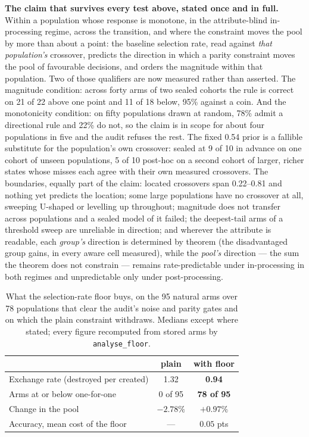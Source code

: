 \documentclass[conference]{IEEEtran}
\begin{document}
\textbf{The claim that survives every test above, stated once and in full.} Within a
population whose response is monotone, in the attribute-blind in-processing regime, across
the transition, and where the constraint moves the pool by more than about a point: the
baseline selection rate, read against \emph{that population's} crossover, predicts the
direction in which a parity constraint moves the pool of favourable decisions, and orders the
magnitude within that population. Two of those qualifiers are now measured rather than
asserted. The magnitude condition: across forty arms of two sealed cohorts the rule is
correct on 21 of 22 above one point and 11 of 18 below, 95\% against a coin. And the
monotonicity condition: on fifty populations drawn at random, 78\% admit a directional rule
and 22\% do not, so the claim is in scope for about four populations in five and the audit
refuses the rest. The fixed 0.54 prior is a fallible
substitute for the population's own crossover: sealed at 9 of 10 in advance on one cohort of
unseen populations, 5 of 10 post-hoc on a second cohort of larger, richer states whose
misses each agree with their own measured crossovers. The boundaries, equally part of the
claim: located crossovers span 0.22--0.81 and nothing yet predicts the location; some large
populations have no crossover at all, sweeping U-shaped or levelling up throughout;
magnitude does not transfer across populations and a sealed model of it failed; the
deepest-tail arms of a threshold sweep are unreliable in direction; and wherever the
attribute is readable, each \emph{group's} direction is determined by theorem (the
disadvantaged group gains, in every aware cell measured), while the \emph{pool's}
direction --- the sum the theorem does not constrain --- remains rate-predictable under
in-processing in both regimes and unpredictable only under post-processing.

\begin{table}[!t]
\caption{What the selection-rate floor buys, on the 95 natural arms over 78 populations that
clear the audit's noise and parity gates and on which the plain constraint withdraws. Medians
except where stated; every figure recomputed from stored arms by
\texttt{analyse\_floor}.}
\label{tab:floor}
\centering
\small
\begin{tabular}{@{}lcc@{}}
\toprule
& \textbf{plain} & \textbf{with floor} \\
\midrule
Exchange rate (destroyed per created) & 1.32 & \textbf{0.94} \\
Arms at or below one-for-one & 0 of 95 & \textbf{78 of 95} \\
Change in the pool & $-2.78\%$ & $\mathbf{+0.97\%}$ \\
Accuracy, mean cost of the floor & --- & $0.05$ pts \\
\bottomrule
\end{tabular}
\end{table}
\end{document}
